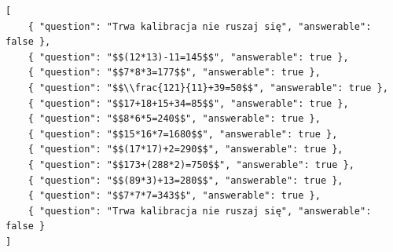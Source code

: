 \documentclass{./assets/wfis}
\begin{document}

\begin{lstlisting}[caption={Plik konfiguracji wyświetlanych pytań},label={pytania-badania}]
[
    { "question": "Trwa kalibracja nie ruszaj się", "answerable": false },
    { "question": "$$(12*13)-11=145$$", "answerable": true },
    { "question": "$$7*8*3=177$$", "answerable": true },
    { "question": "$$\\frac{121}{11}+39=50$$", "answerable": true },
    { "question": "$$17+18+15+34=85$$", "answerable": true },
    { "question": "$$8*6*5=240$$", "answerable": true },
    { "question": "$$15*16*7=1680$$", "answerable": true },
    { "question": "$$(17*17)+2=290$$", "answerable": true },
    { "question": "$$173+(288*2)=750$$", "answerable": true },
    { "question": "$$(89*3)+13=280$$", "answerable": true },
    { "question": "$$7*7*7=343$$", "answerable": true },
    { "question": "Trwa kalibracja nie ruszaj się", "answerable": false }
]
\end{lstlisting}
\end{document}
